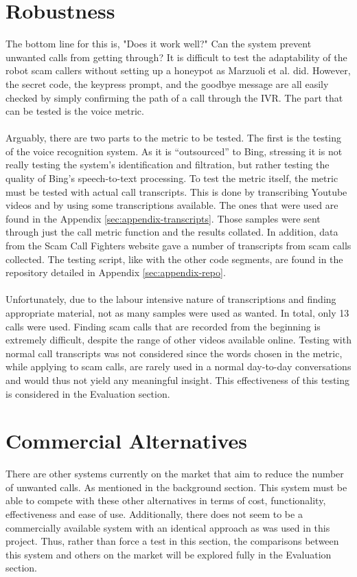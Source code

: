\documentclass[main.tex]{subfiles}
\begin{document}
\section{Robustness}
The bottom line for this is, "Does it work well?" Can the system prevent unwanted calls from getting through? It is difficult to test the adaptability of the robot scam callers without setting up a honeypot as Marzuoli et al. \cite{marzuoli} did. However, the secret code, the keypress prompt, and the goodbye message are all easily checked by simply confirming the path of a call through the IVR. The part that can be tested is the voice metric.
\\\\
Arguably, there are two parts to the metric to be tested. The first is the testing of the voice recognition system. As it is ``outsourced'' to Bing, stressing it is not really testing the system's identification and filtration, but rather testing the quality of Bing's speech-to-text processing. To test the metric itself, the metric must be tested with actual call transcripts. This is done by transcribing Youtube videos and by using some transcriptions available. The ones that were used are found in the Appendix \ref{sec:appendix-transcripts}. Those samples were sent through just the call metric function and the results collated. In addition, data from the Scam Call Fighters website \cite{spam-calls} gave a number of transcripts from scam calls collected. The testing script, like with the other code segments, are found in the repository detailed in Appendix \ref{sec:appendix-repo}.
\\\\
Unfortunately, due to the labour intensive nature of transcriptions and finding appropriate material, not as many samples were used as wanted. In total, only 13 calls were used. Finding scam calls that are recorded from the beginning is extremely difficult, despite the range of other videos available online. Testing with normal call transcripts was not considered since the words chosen in the metric, while applying to scam calls, are rarely used in a normal day-to-day conversations and would thus not yield any meaningful insight. This effectiveness of this testing is considered in the Evaluation section.

\section{Commercial Alternatives}
There are other systems currently on the market that aim to reduce the number of unwanted calls. As mentioned in the background section. This system must be able to compete with these other alternatives in terms of cost, functionality, effectiveness and ease of use. Additionally, there does not seem to be a commercially available system with an identical approach as was used in this project. Thus, rather than force a test in this section, the comparisons between this system and others on the market will be explored fully in the Evaluation section.
\end{document}
